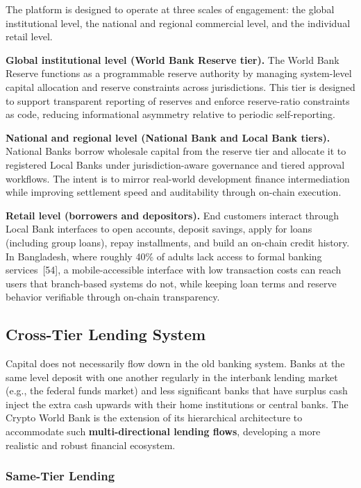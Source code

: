 \documentclass[12pt,a4paper]{report}
\begin{document}
The platform is designed to operate at three scales of engagement: the global institutional level, the national and regional commercial level, and the individual retail level.

\textbf{Global institutional level (World Bank Reserve tier).} The World Bank Reserve functions as a programmable reserve authority by managing system-level capital allocation and reserve constraints across jurisdictions. This tier is designed to support transparent reporting of reserves and enforce reserve-ratio constraints as code, reducing informational asymmetry relative to periodic self-reporting.

\textbf{National and regional level (National Bank and Local Bank tiers).} National Banks borrow wholesale capital from the reserve tier and allocate it to registered Local Banks under jurisdiction-aware governance and tiered approval workflows. The intent is to mirror real-world development finance intermediation while improving settlement speed and auditability through on-chain execution.

\textbf{Retail level (borrowers and depositors).} End customers interact through Local Bank interfaces to open accounts, deposit savings, apply for loans (including group loans), repay installments, and build an on-chain credit history. In Bangladesh, where roughly 40\% of adults lack access to formal banking services~[54], a mobile-accessible interface with low transaction costs can reach users that branch-based systems do not, while keeping loan terms and reserve behavior verifiable through on-chain transparency.

\subsection{Cross-Tier Lending System}

Capital does not necessarily flow down in the old banking system. Banks at the same level deposit with one another regularly in the interbank lending market (e.g., the federal funds market) and less significant banks that have surplus cash inject the extra cash upwards with their home institutions or central banks. The Crypto World Bank is the extension of its hierarchical architecture to accommodate such \textbf{multi-directional lending flows}, developing a more realistic and robust financial ecosystem.

\subsubsection{Same-Tier Lending}
\end{document}
